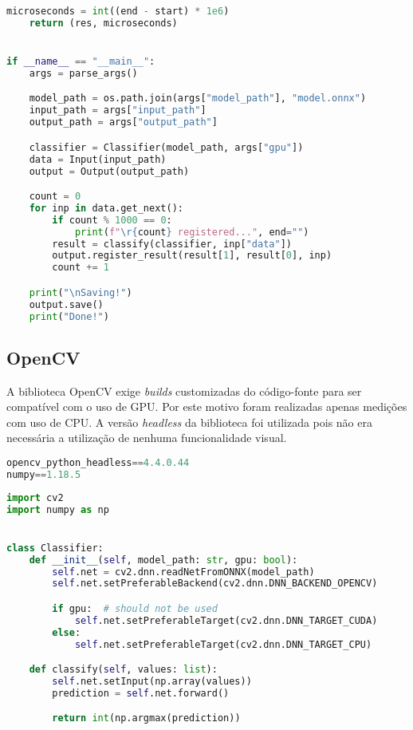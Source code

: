 \begin{lstlisting}[language=Python, caption=Arquivo principal de execução das medições em Python, label={lst:main_python}]
    microseconds = int((end - start) * 1e6)
    return (res, microseconds)


if __name__ == "__main__":
    args = parse_args()

    model_path = os.path.join(args["model_path"], "model.onnx")
    input_path = args["input_path"]
    output_path = args["output_path"]

    classifier = Classifier(model_path, args["gpu"])
    data = Input(input_path)
    output = Output(output_path)

    count = 0
    for inp in data.get_next():
        if count % 1000 == 0:
            print(f"\r{count} registered...", end="")
        result = classify(classifier, inp["data"])
        output.register_result(result[1], result[0], inp)
        count += 1

    print("\nSaving!")
    output.save()
    print("Done!")
\end{lstlisting}

\subsection{OpenCV}

A biblioteca OpenCV exige \textit{builds} customizadas do código-fonte para ser compatível com o uso de GPU. Por este motivo foram realizadas apenas medições com uso de CPU. A versão \textit{headless} da biblioteca foi utilizada pois não era necessária a utilização de nenhuma funcionalidade visual.

\begin{lstlisting}[language=Python, caption=Dependências PIP para uso de OpenCV sem GPU]
opencv_python_headless==4.4.0.44
numpy==1.18.5
\end{lstlisting}

\begin{lstlisting}[language=Python, caption=Classificador implementado em Python utilizando OpenCV]
import cv2
import numpy as np


class Classifier:
    def __init__(self, model_path: str, gpu: bool):
        self.net = cv2.dnn.readNetFromONNX(model_path)
        self.net.setPreferableBackend(cv2.dnn.DNN_BACKEND_OPENCV)

        if gpu:  # should not be used
            self.net.setPreferableTarget(cv2.dnn.DNN_TARGET_CUDA)
        else:
            self.net.setPreferableTarget(cv2.dnn.DNN_TARGET_CPU)

    def classify(self, values: list):
        self.net.setInput(np.array(values))
        prediction = self.net.forward()

        return int(np.argmax(prediction))
\end{lstlisting}

